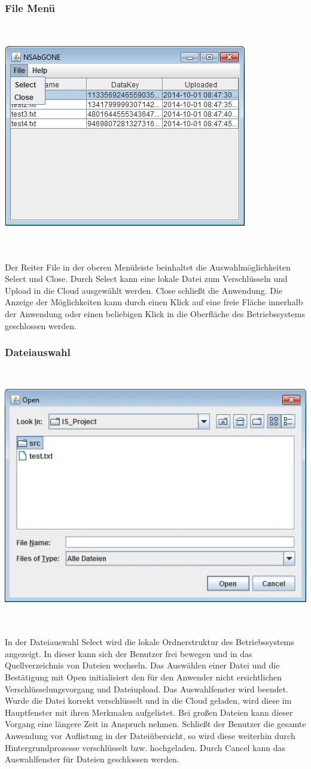 \documentclass[13pt,a4paper,bibliography=totocnumbered,listof=totocnumbered]{scrartcl}
\begin{document}
\subsubsection{File Menü}
$\;$\\
\begin{minipage}{\linewidth}
	\centering
	\includegraphics[width=0.4\linewidth]{./img/File.jpg}
	\label{File}
\end{minipage}
\\\\Der Reiter File in der oberen Menüleiste beinhaltet die Auswahlmöglichkeiten Select und Close. Durch Select kann eine lokale Datei zum Verschlüsseln und Upload in die Cloud ausgewählt werden. Close schließt die Anwendung. Die Anzeige der Möglichkeiten kann durch einen Klick auf eine freie Fläche innerhalb der Anwendung oder einen beliebigen Klick in die Oberfläche des Betriebssystems geschlossen werden.

\subsubsection{Dateiauswahl}
$\;$\\
\begin{minipage}{\linewidth}
	\centering
	\includegraphics[width=0.4\linewidth]{./img/Select.jpg}
	\label{Select}
\end{minipage}
\\\\In der Dateiauswahl Select wird die lokale Ordnerstruktur des Betriebssystems angezeigt. In dieser kann sich der Benutzer frei bewegen und in das Quellverzeichnis von Dateien wechseln. Das Auswählen einer Datei und die Bestätigung mit Open initialisiert den für den Anwender nicht ersichtlichen Verschlüsselungsvorgang und Dateiupload. Das Auswahlfenster wird beendet. Wurde die Datei korrekt verschlüsselt und in die Cloud geladen, wird diese im Hauptfenster mit ihren Merkmalen aufgelistet. Bei großen Dateien kann dieser Vorgang eine längere Zeit in Anspruch nehmen. Schließt der Benutzer die gesamte Anwendung vor Auflistung in der Dateiübersicht, so wird diese weiterhin durch Hintergrundprozesse verschlüsselt bzw. hochgeladen. Durch Cancel kann das Auswahlfenster für Dateien geschlossen werden.
\end{document}
